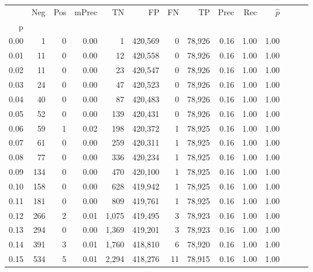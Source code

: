 \begin{tabular}{rrrrrrrrrrrrrr}
\toprule
{} &     Neg &    Pos & mPrec &       TN &       FP &      FN &      TP &  Prec &   Rec & $\hat{p}$ \\
p    &         &        &       &          &          &         &         &       &       &           \\
\midrule
0.00 &       1 &      0 &  0.00 &        1 &  420,569 &       0 &  78,926 &  0.16 &  1.00 &      1.00 \\
0.01 &      11 &      0 &  0.00 &       12 &  420,558 &       0 &  78,926 &  0.16 &  1.00 &      1.00 \\
0.02 &      11 &      0 &  0.00 &       23 &  420,547 &       0 &  78,926 &  0.16 &  1.00 &      1.00 \\
0.03 &      24 &      0 &  0.00 &       47 &  420,523 &       0 &  78,926 &  0.16 &  1.00 &      1.00 \\
0.04 &      40 &      0 &  0.00 &       87 &  420,483 &       0 &  78,926 &  0.16 &  1.00 &      1.00 \\
0.05 &      52 &      0 &  0.00 &      139 &  420,431 &       0 &  78,926 &  0.16 &  1.00 &      1.00 \\
0.06 &      59 &      1 &  0.02 &      198 &  420,372 &       1 &  78,925 &  0.16 &  1.00 &      1.00 \\
0.07 &      61 &      0 &  0.00 &      259 &  420,311 &       1 &  78,925 &  0.16 &  1.00 &      1.00 \\
0.08 &      77 &      0 &  0.00 &      336 &  420,234 &       1 &  78,925 &  0.16 &  1.00 &      1.00 \\
0.09 &     134 &      0 &  0.00 &      470 &  420,100 &       1 &  78,925 &  0.16 &  1.00 &      1.00 \\
0.10 &     158 &      0 &  0.00 &      628 &  419,942 &       1 &  78,925 &  0.16 &  1.00 &      1.00 \\
0.11 &     181 &      0 &  0.00 &      809 &  419,761 &       1 &  78,925 &  0.16 &  1.00 &      1.00 \\
0.12 &     266 &      2 &  0.01 &    1,075 &  419,495 &       3 &  78,923 &  0.16 &  1.00 &      1.00 \\
0.13 &     294 &      0 &  0.00 &    1,369 &  419,201 &       3 &  78,923 &  0.16 &  1.00 &      1.00 \\
0.14 &     391 &      3 &  0.01 &    1,760 &  418,810 &       6 &  78,920 &  0.16 &  1.00 &      1.00 \\
0.15 &     534 &      5 &  0.01 &    2,294 &  418,276 &      11 &  78,915 &  0.16 &  1.00 &      1.00 \\

\end{tabular}
